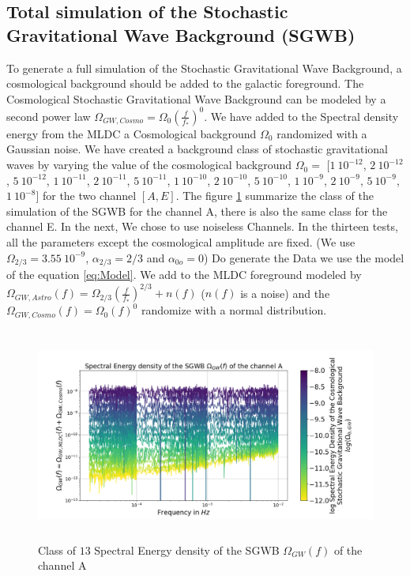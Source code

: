 \documentclass[a4paper,12pt]{article}
\begin{document}
\subsection{Total simulation of the Stochastic Gravitational Wave Background (SGWB)}

To generate a full simulation of the Stochastic Gravitational Wave Background, a cosmological background should be added to the galactic foreground. The Cosmological Stochastic Gravitational Wave Background can be modeled by a second power law $\Omega_{GW,Cosmo} = \Omega_0 \left(\frac{f}{f_*}\right)^0$.  We have added to the Spectral density energy from the MLDC a Cosmological background $\Omega_0$ randomized with a Gaussian noise. We have created a background class of stochastic gravitational waves by varying the value of the cosmological background $\Omega_0 =$ [$1 \ 10^{-12}$, $2 \ 10^{-12}$, $5 \ 10^{-12}$, $1 \ 10^{-11}$, $2 \ 10^{-11}$, $5 \ 10^{-11}$, $1 \ 10^{-10}$, $2 \ 10^{-10}$, $5 \ 10^{-10}$, $1 \ 10^{-9}$, $2 \ 10^{-9}$, $5 \ 10^{-9}$, $1 \ 10^{-8}$] for the two channel $[A,E]$. The figure \ref{fig:Omega_tot} summarize the class of the simulation of the SGWB for the channel A, there is also the same class for the channel E. In the next, We chose to use noiseless Channels. In the thirteen tests, all the parameters except the cosmological amplitude are fixed. (We use $\Omega_{2/3} = 3.55 \ 10^{-9}$, $\alpha_{2/3}=2/3$ and $\alpha_{0o}=0$) Do generate the Data we use the model of the equation \ref{eq:Model}. We add to the MLDC foreground modeled by $\Omega_{GW,Astro}(f) = \Omega_{2/3} \left(\frac{f}{f_*}\right)^{2/3} +n(f)$ ($n(f)$ is a noise) and the $\Omega_{GW,Cosmo}(f) = \Omega_{0} \left(f\right)^{0}$ randomize with a normal distribution.

\begin{figure}[H]
    \centering
    \includegraphics[height= 7cm]{Omega_tot.png}
    \caption{Class of $13$ Spectral Energy density of the SGWB $\Omega_{GW}(f)$ of the channel A }
    \label{fig:Omega_tot}
\end{figure}
\end{document}

